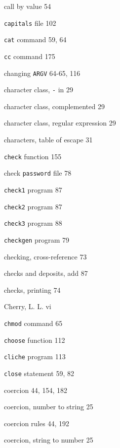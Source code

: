 \begin{multicols}{3}
\hangindent=4pc  call by value 54

\hangindent=4pc  \verb'capitals' file 102

\hangindent=4pc  \verb'cat' command 59, 64

\hangindent=4pc  \verb'cc' command 175

\hangindent=4pc  changing \verb'ARGV' 64-65, 116

\hangindent=4pc  character class, \verb'-' in 29

\hangindent=4pc  character class, complemented 29

\hangindent=4pc  character class, regular expression 29

\hangindent=4pc  characters, table of escape 31

\hangindent=4pc  \verb'check' function 155

\hangindent=4pc  check \verb'password' file 78

\hangindent=4pc  \verb'check1' program 87

\hangindent=4pc  \verb'check2' program 87

\hangindent=4pc  \verb'check3' program 88

\hangindent=4pc  \verb'checkgen' program 79

\hangindent=4pc  checking, cross-reference 73

\hangindent=4pc  checks and deposits, add 87

\hangindent=4pc  checks, printing 74

\hangindent=4pc  Cherry, L. L. vi

\hangindent=4pc  \verb'chmod' command 65

\hangindent=4pc  \verb'choose' function 112

\hangindent=4pc  \verb'cliche' program 113

\hangindent=4pc  \verb'close' statement 59, 82

\hangindent=4pc  coercion 44, 154, 182

\hangindent=4pc  coercion, number to string 25

\hangindent=4pc  coercion rules 44, 192

\hangindent=4pc  coercion, string to number 25


\end{multicols}

